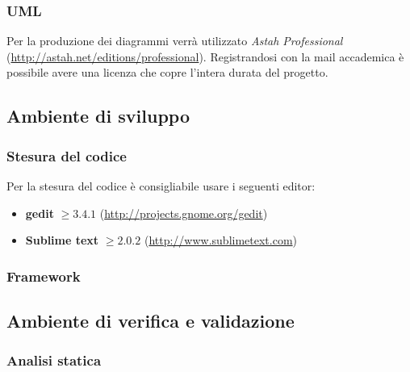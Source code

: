 		
		\subsubsection{UML}
		
		Per la produzione dei diagrammi \emph{} verrà utilizzato \emph{Astah Professional} (\url{http://astah.net/editions/professional}). Registrandosi con la mail accademica è possibile avere una licenza che copre l'intera durata del progetto.
		
	
	\subsection{Ambiente di sviluppo}
		
		\subsubsection{Stesura del codice}
		
		Per la stesura del codice è consigliabile usare i seguenti editor:
		\begin{itemize}
			\item \textbf{gedit} $\geq 3.4.1$ (\url{http://projects.gnome.org/gedit})
			\item \textbf{Sublime text} $\geq 2.0.2$ (\url{http://www.sublimetext.com})
		\end{itemize}
		
		\subsubsection{Framework}


	\subsection{Ambiente di verifica e validazione}
		\subsubsection{Analisi statica}
		
